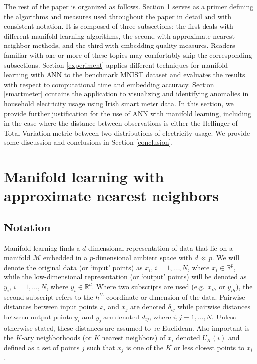 \documentclass[12pt]{article}
\begin{document}
The rest of the paper is organized as follows.
Section \ref{mlann} serves as a primer defining the algorithms and measures used throughout the paper in detail and with consistent notation. It is composed of three subsections; the first deals with different manifold learning algorithms, the second with approximate nearest neighbor methods, and the third with embedding quality measures. Readers familiar with one or more of these topics may comfortably skip the corresponding subsections. Section \ref{experiment} applies different techniques for manifold learning with ANN to the benchmark MNIST dataset and evaluates the results with respect to computational time and embedding accuracy. Section \ref{smartmeter} contains the application to visualizing and identifying anomalies in household electricity usage using Irish smart meter data. In this section, we provide further justification for the use of ANN with manifold learning, including in the case where the distance between observations is either the Hellinger of Total Variation metric between two distributions of electricity usage. We provide some discussion and conclusions in Section \ref{conclusion}.

\hypertarget{mlann}{%
\section{Manifold learning with approximate nearest neighbors}\label{mlann}}

\hypertarget{notation}{%
\subsection{Notation}\label{notation}}

Manifold learning finds a \(d\)-dimensional representation of data that lie on a manifold \(\mathcal{M}\) embedded in a \(p\)-dimensional ambient space with \(d \ll p\). We will denote the original data (or `input' points) as \(x_i\), \(i=1,\dots,N\), where \(x_i\in\mathbb{R}^p\), while the low-dimensional representation (or `output' points) will be denoted as \(y_i\), \(i=1,\dots,N\), where \(y_i\in\mathbb{R}^d\). Where two subscripts are used (e.g.~\(x_{ih}\) or \(y_{ih}\)), the second subscript refers to the \(h^{th}\) coordinate or dimension of the data. Pairwise distances between input points \(x_i\) and \(x_j\) are denoted \(\delta_{ij}\) while pairwise distances between output points \(y_i\) and \(y_j\) are denoted \(d_{ij}\), where \(i,j=1,\dots,N\). Unless otherwise stated, these distances are assumed to be Euclidean. Also important is the \(K\)-ary neighborhoods (or \(K\) nearest neighbors) of \(x_i\) denoted \(U_K(i)\) and defined as a set of points \(j\) such that \(x_j\) is one of the \(K\) or less closest points to \(x_i\).
\end{document}

